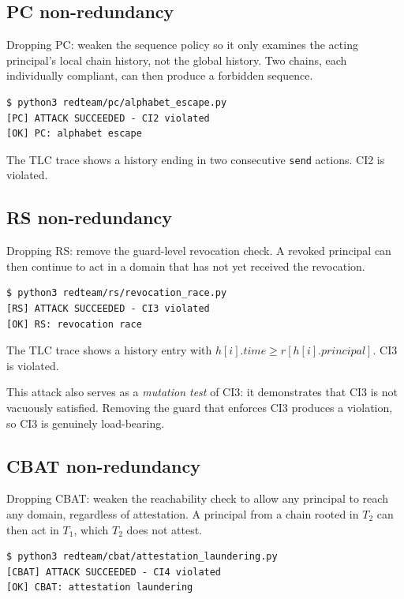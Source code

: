 \documentclass[11pt,a4paper]{article}
\theoremstyle{plain}
\theoremstyle{definition}
\theoremstyle{remark}
\begin{document}
\subsection{PC non-redundancy}

Dropping PC: weaken the sequence policy so it only examines the acting
principal's local chain history, not the global history. Two chains, each
individually compliant, can then produce a forbidden sequence.

\begin{verbatim}
$ python3 redteam/pc/alphabet_escape.py
[PC] ATTACK SUCCEEDED - CI2 violated
[OK] PC: alphabet escape
\end{verbatim}

The TLC trace shows a history ending in two consecutive \texttt{send} actions.
CI2 is violated.

\subsection{RS non-redundancy}

Dropping RS: remove the guard-level revocation check. A revoked principal can
then continue to act in a domain that has not yet received the revocation.

\begin{verbatim}
$ python3 redteam/rs/revocation_race.py
[RS] ATTACK SUCCEEDED - CI3 violated
[OK] RS: revocation race
\end{verbatim}

The TLC trace shows a history entry with $h[i].\mathit{time} \ge
r[h[i].\mathit{principal}]$. CI3 is violated.

This attack also serves as a \emph{mutation test} of CI3: it demonstrates that
CI3 is not vacuously satisfied. Removing the guard that enforces CI3 produces
a violation, so CI3 is genuinely load-bearing.

\subsection{CBAT non-redundancy}

Dropping CBAT: weaken the reachability check to allow any principal to reach
any domain, regardless of attestation. A principal from a chain rooted in
$T_2$ can then act in $T_1$, which $T_2$ does not attest.

\begin{verbatim}
$ python3 redteam/cbat/attestation_laundering.py
[CBAT] ATTACK SUCCEEDED - CI4 violated
[OK] CBAT: attestation laundering
\end{verbatim}
\end{document}
